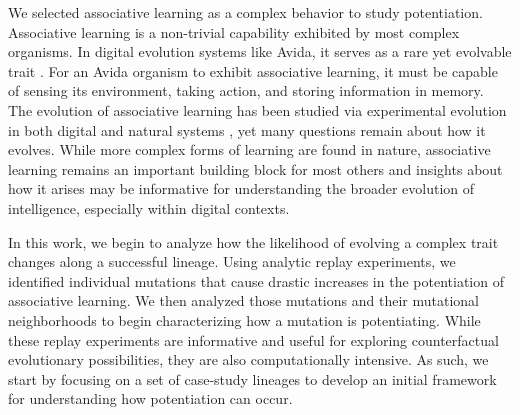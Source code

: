 We selected associative learning as a complex behavior to study potentiation.
Associative learning is a non-trivial capability exhibited by most complex organisms.
In digital evolution systems like Avida, it serves as a rare yet evolvable trait \citep{pontesEvolutionaryOriginAssociative2020}.
For an Avida organism to exhibit associative learning, it must be capable of sensing its environment, taking action, and storing information in memory. 
The evolution of associative learning has been studied via experimental evolution in both digital \citep{pontesEvolutionaryOriginAssociative2020, mcgregorEvolutionAssociativeLearning2012} and natural systems \citep{dunlapExperimentalEvolutionPrepared2014a, meryExperimentalEvolutionLearning2002}, yet many questions remain about how it evolves.
While more complex forms of learning are found in nature, associative learning remains an important building block for most others and insights about how it arises may be informative for understanding the broader evolution of intelligence, especially within digital contexts.

In this work, we begin to analyze how the likelihood of evolving a complex trait changes along a successful lineage.
Using analytic replay experiments, we identified individual mutations that cause drastic increases in the potentiation of associative learning. 
We then analyzed those mutations and their mutational neighborhoods to begin characterizing how a mutation is potentiating.  
While these replay experiments are informative and useful for exploring counterfactual evolutionary possibilities, they are also computationally intensive.  
As such, %
we start by focusing on a set of case-study lineages to develop an initial framework for understanding how potentiation can occur.

